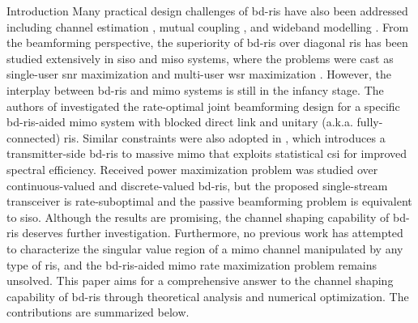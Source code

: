 \documentclass[journal]{IEEEtran}
\begin{document}
\begin{section}{Introduction}
	Many practical design challenges of \gls{bd}-\gls{ris} have also been addressed including channel estimation \cite{Li2024}, mutual coupling \cite{Li2023f}, and wideband modelling \cite{Li2024a}.
	From the beamforming perspective, the superiority of \gls{bd}-\gls{ris} over diagonal \gls{ris} has been studied extensively in \gls{siso} and \gls{miso} systems, where the problems were cast as single-user \gls{snr} maximization \cite{Shen2020a,Nerini2023,Nerini2024,Santamaria2023} and multi-user \gls{wsr} maximization \cite{Fang2023,Zhou2023,Li2023c,Soleymani2024}.
	However, the interplay between \gls{bd}-\gls{ris} and \gls{mimo} systems is still in the infancy stage.
	The authors of \cite{Bartoli2023} investigated the rate-optimal joint beamforming design for a specific \gls{bd}-\gls{ris}-aided \gls{mimo} system with blocked direct link and unitary (a.k.a. fully-connected) \gls{ris}.
	Similar constraints were also adopted in \cite{Mishra2024}, which introduces a transmitter-side \gls{bd}-\gls{ris} to massive \gls{mimo} that exploits statistical \gls{csi} for improved spectral efficiency.
	Received power maximization problem was studied over continuous-valued \cite{Nerini2023} and discrete-valued \cite{Nerini2023b} \gls{bd}-\gls{ris}, but the proposed single-stream transceiver is rate-suboptimal and the passive beamforming problem is equivalent to \gls{siso}.
	Although the results are promising, the channel shaping capability of \gls{bd}-\gls{ris} deserves further investigation.
	Furthermore, no previous work has attempted to characterize the singular value region of a \gls{mimo} channel manipulated by any type of \gls{ris}, and the \gls{bd}-\gls{ris}-aided \gls{mimo} rate maximization problem remains unsolved.
	This paper aims for a comprehensive answer to the channel shaping capability of \gls{bd}-\gls{ris} through theoretical analysis and numerical optimization.
	The contributions are summarized below.




\end{section}
\end{document}
